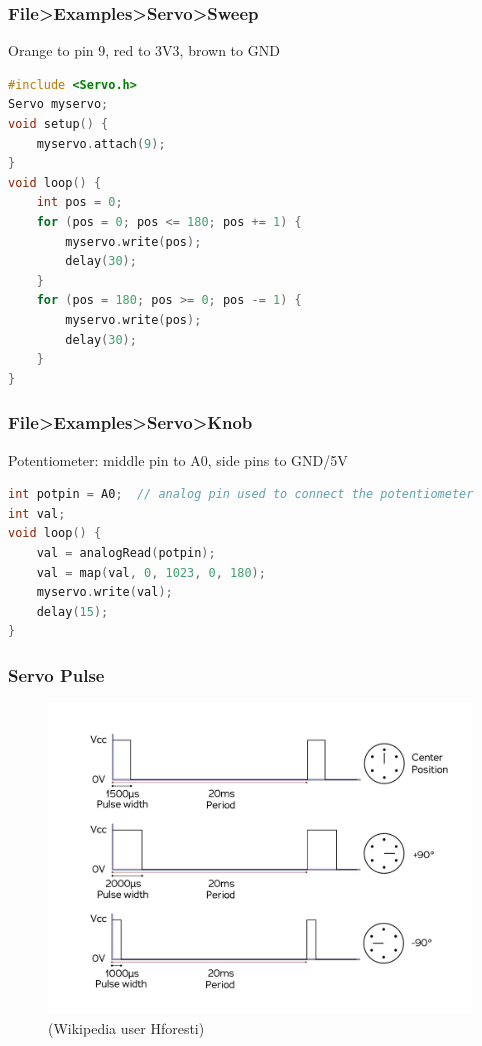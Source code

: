 \documentclass[compress, aspectratio=32]{beamer}
\begin{document}
\begin{frame}[fragile]
    \frametitle{File>Examples>Servo>Sweep}
    Orange to pin 9, red to 3V3, brown to GND
    \begin{lstlisting}[language=c]
#include <Servo.h>
Servo myservo;
void setup() {
    myservo.attach(9);
}
void loop() {
    int pos = 0;
    for (pos = 0; pos <= 180; pos += 1) {  
        myservo.write(pos);  
        delay(30);           
    }
    for (pos = 180; pos >= 0; pos -= 1) {  
        myservo.write(pos);                  
        delay(30);
    }
}
    \end{lstlisting}
\end{frame}

\begin{frame}[fragile]
    \frametitle{File>Examples>Servo>Knob}
    Potentiometer: middle pin to A0, side pins to GND/5V
    \begin{lstlisting}[language=c, numbers=none]
int potpin = A0;  // analog pin used to connect the potentiometer
int val;
void loop() {
    val = analogRead(potpin);            
    val = map(val, 0, 1023, 0, 180);     
    myservo.write(val);                  
    delay(15);                           
}
    \end{lstlisting}
\end{frame}

\begin{frame}
    \frametitle{Servo Pulse}
    \begin{figure}
        \includegraphics[height=0.7\textheight]{Servomotor_Timing_Diagram.jpg}  
        \centering
        \caption*{(Wikipedia user Hforesti)}
    \end{figure}
\end{frame}
\end{document}
